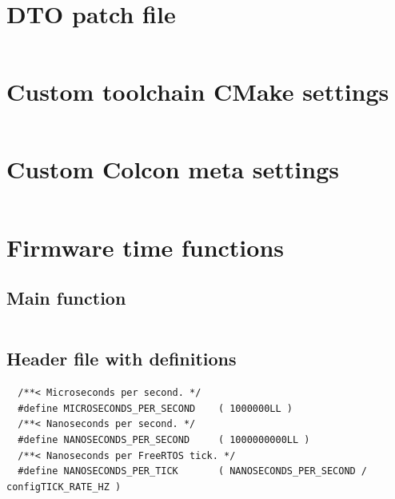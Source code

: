 \documentclass[10pt]{article}
\begin{document}
\pagebreak
\appendix
\section{DTO patch file}
\label{sec:DTO patch file}
\inputminted[linenos]{diff}{./src/system.patch}

\pagebreak
\section{Custom toolchain CMake settings}
\label{sec:toolchainsettings}
\inputminted[linenos]{cmake}{./src/custom_r5f_toolchain.cmake}

\pagebreak
\section{Custom Colcon meta settings}
\label{sec:colconsettings}
\inputminted[linenos]{yaml}{./src/custom_r5f_colcon.meta}

\pagebreak
\section{Firmware time functions}
\label{sec:timefunctions}

\subsection{Main function}
\inputminted[linenos]{c}{./src/clock.c}

\subsection{Header file with definitions}
\begin{verbatim}
  /**< Microseconds per second. */
  #define MICROSECONDS_PER_SECOND    ( 1000000LL )  
  /**< Nanoseconds per second. */
  #define NANOSECONDS_PER_SECOND     ( 1000000000LL ) 
  /**< Nanoseconds per FreeRTOS tick. */  
  #define NANOSECONDS_PER_TICK       ( NANOSECONDS_PER_SECOND / configTICK_RATE_HZ ) 
\end{verbatim}
\end{document}
